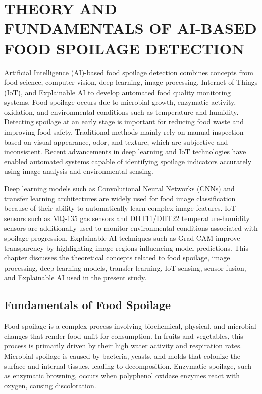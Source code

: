 \chapter{THEORY AND FUNDAMENTALS OF AI-BASED FOOD SPOILAGE DETECTION}
Artificial Intelligence (AI)-based food spoilage detection combines concepts from food science, computer vision, deep learning, image processing, Internet of Things (IoT), and Explainable AI to develop automated food quality monitoring systems. Food spoilage occurs due to microbial growth, enzymatic activity, oxidation, and environmental conditions such as temperature and humidity. Detecting spoilage at an early stage is important for reducing food waste and improving food safety. Traditional methods mainly rely on manual inspection based on visual appearance, odor, and texture, which are subjective and inconsistent. Recent advancements in deep learning and IoT technologies have enabled automated systems capable of identifying spoilage indicators accurately using image analysis and environmental sensing.

Deep learning models such as Convolutional Neural Networks (CNNs) and transfer learning architectures are widely used for food image classification because of their ability to automatically learn complex image features. IoT sensors such as MQ-135 gas sensors and DHT11/DHT22 temperature-humidity sensors are additionally used to monitor environmental conditions associated with spoilage progression. Explainable AI techniques such as Grad-CAM improve transparency by highlighting image regions influencing model predictions. This chapter discusses the theoretical concepts related to food spoilage, image processing, deep learning models, transfer learning, IoT sensing, sensor fusion, and Explainable AI used in the present study.

\section[Fundamentals of Food Spoilage]{\textbf{Fundamentals of Food Spoilage}}
Food spoilage is a complex process involving biochemical, physical, and microbial changes that render food unfit for consumption. In fruits and vegetables, this process is primarily driven by their high water activity and respiration rates. Microbial spoilage is caused by bacteria, yeasts, and molds that colonize the surface and internal tissues, leading to decomposition. Enzymatic spoilage, such as enzymatic browning, occurs when polyphenol oxidase enzymes react with oxygen, causing discoloration.

